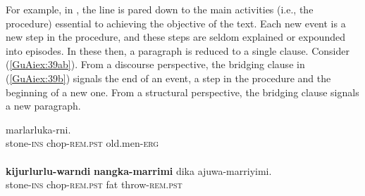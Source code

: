 \documentclass[output=paper]{LSP/langsci}
\begin{document}
For example, in , the  line is pared down to the main activities (i.e., the procedure) essential to achieving the objective of the text. Each new event is a new step in the procedure, and these steps are seldom explained or expounded into episodes. In these  then, a paragraph is reduced to a single clause. Consider (\ref{GuAiex:39ab}). From a discourse perspective, the bridging clause in (\ref{GuAiex:39b}) signals the end of an event, a step in the procedure and the beginning of a new one. From a structural perspective, the bridging clause signals a new paragraph.

\begin{exe}
\ex \label{GuAiex:39ab}
\begin{xlist}
\ex \label{GuAiex:39a}
\gll \underline{}   \underline{}     marlarluka-rni.\\
stone-\textsc{ins}     chop-\textsc{rem.pst}     old.men-\textsc{erg}\\
\glt {} \\
\ex \label{GuAiex:39b}
\gll \textbf{kijurlurlu-warndi}   \textbf{nangka-marrimi}  dika   ajuwa-marriyimi. \\
stone-\textsc{ins}     chop-\textsc{rem.pst}    fat   throw-\textsc{rem.pst} \\
\glt {}
\end{xlist}
\end{exe}
\end{document}
